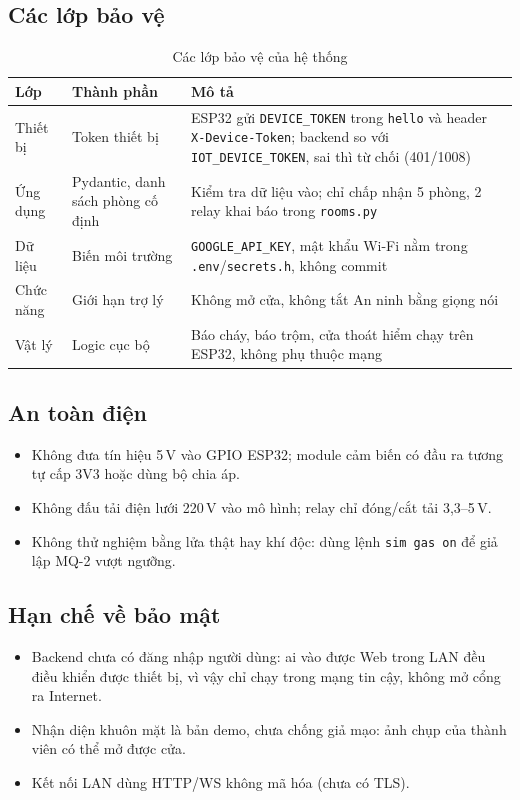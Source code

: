 \documentclass[12pt,a4paper]{extarticle}
\newcommand{\hang}{}  %
\begin{document}
\subsection{Các lớp bảo vệ}
\begin{table}[H]
\centering
\begin{tabularx}{\linewidth}{|p{2.6cm}|p{4cm}|L|}
\hline
\hang \textbf{Lớp} & \textbf{Thành phần} & \textbf{Mô tả} \\ \hline
Thiết bị & Token thiết bị & ESP32 gửi \texttt{DEVICE\_TOKEN} trong \texttt{hello} và header \texttt{X-Device-Token}; backend so với \texttt{IOT\_DEVICE\_TOKEN}, sai thì từ chối (401/1008) \\ \hline
Ứng dụng & Pydantic, danh sách phòng cố định & Kiểm tra dữ liệu vào; chỉ chấp nhận 5 phòng, 2 relay khai báo trong \texttt{rooms.py} \\ \hline
Dữ liệu & Biến môi trường & \texttt{GOOGLE\_API\_KEY}, mật khẩu Wi-Fi nằm trong \texttt{.env}/\texttt{secrets.h}, không commit \\ \hline
Chức năng & Giới hạn trợ lý & Không mở cửa, không tắt An ninh bằng giọng nói \\ \hline
Vật lý & Logic cục bộ & Báo cháy, báo trộm, cửa thoát hiểm chạy trên ESP32, không phụ thuộc mạng \\ \hline
\end{tabularx}
\caption{Các lớp bảo vệ của hệ thống}
\label{tab:baomat}
\end{table}

\subsection{An toàn điện}
\begin{itemize}
  \item Không đưa tín hiệu 5\,V vào GPIO ESP32; module cảm biến có đầu ra tương tự cấp 3V3 hoặc dùng bộ chia áp.
  \item Không đấu tải điện lưới 220\,V vào mô hình; relay chỉ đóng/cắt tải 3,3--5\,V.
  \item Không thử nghiệm bằng lửa thật hay khí độc: dùng lệnh \texttt{sim gas on} để giả lập MQ-2 vượt ngưỡng.
\end{itemize}

\subsection{Hạn chế về bảo mật}
\begin{itemize}
  \item Backend chưa có đăng nhập người dùng: ai vào được Web trong LAN đều điều khiển được thiết bị, vì vậy chỉ chạy trong mạng tin cậy, không mở cổng ra Internet.
  \item Nhận diện khuôn mặt là bản demo, chưa chống giả mạo: ảnh chụp của thành viên có thể mở được cửa.
  \item Kết nối LAN dùng HTTP/WS không mã hóa (chưa có TLS).
\end{itemize}
\end{document}
